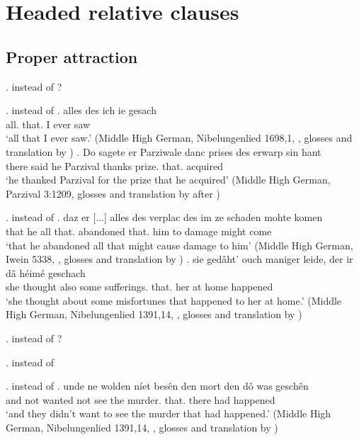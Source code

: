 \section{Headed relative clauses}

\subsection{Proper attraction}

\ex.  instead of ?

\ex.  instead of 
\ag. alles des ich ie gesach\\
 all. that. I ever saw\\
 `all that I ever saw.' \hfill (Middle High German, Nibelungenlied 1698,1, \citealt[756]{behaghel1923}, glosses and translation by \citealt[199]{pittner1995})
\bg. Do sagete er Parziwale danc prises des erwarp sin hant\\
 there said he Parzival thanks prize. that. acquired\\
 `he thanked Parzival for the prize that he acquired' \hfill (Middle High German, Parzival 3:1209, glosses and translation by \citealt[174]{helgander1971} after \citealt[198]{pittner1995})

\ex.  instead of 
\ag. daz er [...] alles des verplac des im ze schaden mohte komen \\
 that he all that. abandoned that. him to damage might come\\
 `that he abandoned all that might cause damage to him' \hfill (Middle High German, Iwein 5338, \citealt[756]{behaghel1923}, glosses and translation by \citealt[198]{pittner1995})
\bg.  sie gedâht' ouch maniger leide, der ir dâ héimé geschach\\
 she thought also some sufferings. that. her at home happened\\
 `she thought about some misfortunes that happened to her at home.' \hfill (Middle High German, Nibelungenlied 1391,14, \citealt[756]{behaghel1923}, glosses and translation by \citealt[198]{pittner1995})

\ex.  instead of ?

\ex.  instead of 


\ex.  instead of 
\ag. unde ne wolden níet besên den mort den dô was geschên\\
 and not wanted not see the murder. that. there had happened\\
 `and they didn't want to see the murder that had happened.' \hfill (Middle High German, Nibelungenlied 1391,14, \citealt[756]{behaghel1923}, glosses and translation by \citealt[198]{pittner1995})









\phantom{x}

